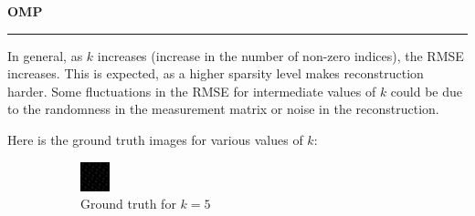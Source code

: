 \documentclass[a4paper,12pt]{article}
\newenvironment{solution}[2][]{%
    \begin{mdframed}[linecolor=blue!70!black, linewidth=2pt, roundcorner=10pt, backgroundcolor=yellow!10!white, skipabove=12pt, skipbelow=12pt]%
        \textbf{\large #2}
        \par\noindent\rule{\textwidth}{0.4pt}
}{
    \end{mdframed}
}
\begin{document}
\begin{solution}{OMP}
In general, as $k$ increases (increase in the number of non-zero indices), the RMSE increases. This is expected, as a higher sparsity level makes reconstruction harder. Some fluctuations in the RMSE for intermediate values of $k$ could be due to the randomness in the measurement matrix or noise in the reconstruction.

Here is the ground truth images for various values of $k$:

\begin{figure}[H]
  \centering
  \begin{subfigure}[t]{0.32\textwidth}
      \centering
      \includegraphics[width=\textwidth]{../images/omp/Ground_Truth_k_5.png}
      \caption{Ground truth for $k = 5$}
  \end{subfigure}
  \begin{subfigure}[t]{0.32\textwidth}
      \centering

\end{subfigure}
\end{figure}
\end{solution}
\end{document}
